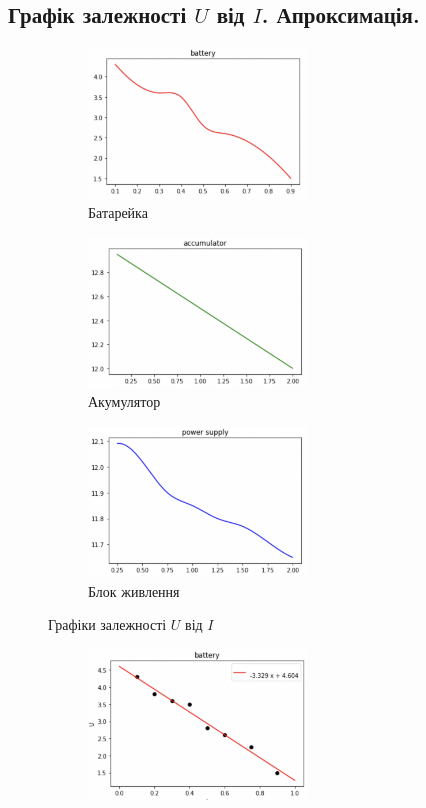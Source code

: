\documentclass[a4paper,12pt]{article}
\begin{document}
\begin{justify}
	\subsection{Графік залежності $U$ від $I$. Апроксимація.}
	\begin{figure}[!h]
		\centering
		\begin{subfigure}{0.4\linewidth}
			\includegraphics[height=40mm]{media/graph5a.png}
    		\caption{Батарейка}
			\label{fig:5a}
    	\end{subfigure}\hfill
    	\begin{subfigure}{0.4\linewidth}
			\includegraphics[height=40mm]{media/graph5b.png}
    		\caption{Акумулятор}
			\label{fig:5b}
    	\end{subfigure}\hfill
    	\begin{subfigure}{0.4\linewidth}
			\includegraphics[height=40mm]{media/graph5c.png}
    		\caption{Блок живлення}
			\label{fig:5c}
    	\end{subfigure}\hfill
		\caption{Графіки залежності $U$ від $I$}
		\label{fig:5}
	\end{figure}
	\begin{figure}[!h]
		\centering
		\begin{subfigure}{0.4\linewidth}
			\includegraphics[height=40mm]{media/graph6a.png}

\end{subfigure}
\end{figure}
\end{justify}
\end{document}
